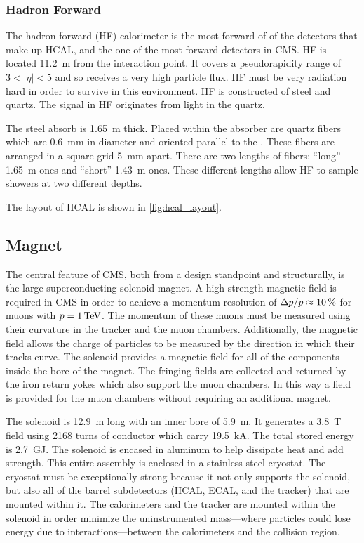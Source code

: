 \subsubsection{Hadron Forward}

The hadron forward (HF) calorimeter is the most forward of of the detectors
that make up HCAL, and the one of the most forward detectors in CMS. HF is
located \SI{11.2}{\meter} from the interaction point. It covers a pseudorapidity
range of $3 < |\eta| < 5$ and so receives a very high particle flux. HF must be
very radiation hard in order to survive in this environment. HF is constructed
of steel and quartz. The signal in HF originates from \Cherenkov light in the
quartz.

The steel absorb is \SI{1.65}{\meter} thick. Placed within the absorber are
quartz fibers which are \SI{0.6}{\milli\meter} in diameter and oriented
parallel to the \zaxis. These fibers are arranged in a square grid
\SI{5}{\milli\meter} apart. There are two lengths of fibers: ``long''
\SI{1.65}{\meter} ones and ``short'' \SI{1.43}{\meter} ones. These different
lengths allow HF to sample showers at two different depths.

The layout of HCAL is shown in \cref{fig:hcal_layout}.

\subsection{Magnet}

The central feature of CMS, both from a design standpoint and structurally, is
the large superconducting solenoid magnet. A high strength magnetic field is
required in CMS in order to achieve a momentum resolution of $\Delta p
/ p \approx \SI{10}{\percent}$ for muons with $\momentum =
\SI{1}{\TeV}$. The momentum of these muons must be measured using their
curvature in the tracker and the muon chambers. Additionally, the magnetic
field allows the charge of particles to be measured by the direction in which
their tracks curve. The solenoid provides a magnetic field for all of the
components inside the bore of the magnet. The fringing fields are collected and
returned by the iron return yokes which also support the muon chambers. In this
way a field is provided for the muon chambers without requiring an additional
magnet.

The solenoid is \SI{12.9}{\meter} long with an inner bore of \SI{5.9}{\meter}.
It generates a \SI{3.8}{\tesla} field using \num{2168} turns of conductor which
carry \SI{19.5}{\kilo\ampere}. The total stored energy is
\SI{2.7}{\giga\joule}. The solenoid is encased in aluminum to help dissipate
heat and add strength. This entire assembly is enclosed in a stainless steel
cryostat. The cryostat must be exceptionally strong because it not only
supports the solenoid, but also all of the barrel subdetectors (HCAL, ECAL, and
the tracker) that are mounted within it. The calorimeters and the tracker are
mounted within the solenoid in order minimize the uninstrumented mass---where
particles could lose energy due to interactions---between the calorimeters and
the collision region.

